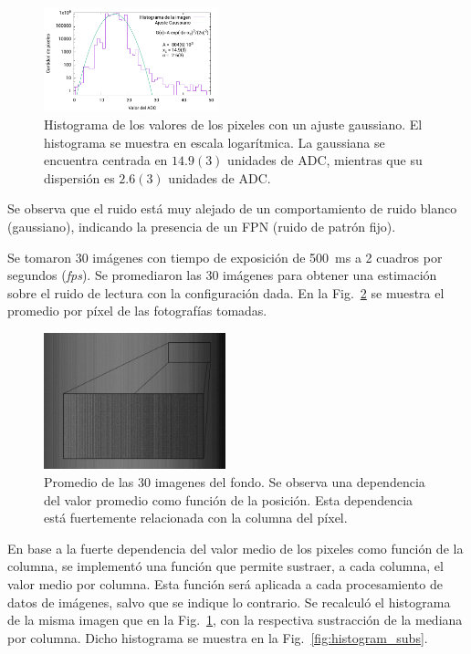 \documentclass[twoside,twocolumn]{article}
\begin{document}
      \begin{figure}[h]
        \includegraphics[width=0.45\textwidth]{figures/background_histo.pdf}
        \caption{Histograma de los valores de los pixeles con un ajuste gaussiano.
          El histograma se muestra en escala logarítmica.
          La gaussiana se encuentra centrada en $14.9(3)$ unidades de ADC,
          mientras que su dispersión es $2.6(3)$ unidades de ADC.}
        \label{fig:histogram}
      \end{figure}

      Se observa que el ruido está muy alejado de un comportamiento de ruido blanco (gaussiano),
      indicando la presencia de un FPN (ruido de patrón fijo).
      
      Se tomaron 30 imágenes con tiempo de exposición de \SI{500}{\milli\second} a 2 cuadros por segundos (\emph{fps}).
      Se promediaron las 30 imágenes para obtener una estimación sobre el ruido de lectura con la configuración dada. 
      En la Fig.~\ref{fig:background} se muestra el promedio por píxel de las fotografías tomadas.

      \begin{figure}[h]
        \includegraphics[width=0.47\textwidth]{figures/background.jpg}
        \caption{Promedio de las 30 imagenes del fondo. 
          Se observa una dependencia del valor promedio como función de la posición.
          Esta dependencia está fuertemente relacionada con la columna del píxel. }
        \label{fig:background}
      \end{figure}
    
      En base a la fuerte dependencia del valor medio de los pixeles como función de la columna,
      se implementó una función que permite sustraer, a cada columna, el valor medio por columna.
      Esta función será aplicada a cada procesamiento de datos de imágenes, salvo que se indique lo contrario.
      Se recalculó el histograma de la misma imagen que en la Fig.~\ref{fig:histogram}, con la respectiva sustracción
      de la mediana por columna. Dicho histograma se muestra en la Fig.~\ref{fig:histogram_subs}.
\end{document}
